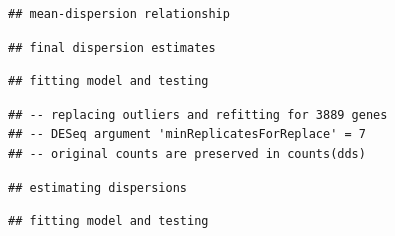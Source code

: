 \documentclass[]{article}
\begin{document}
\begin{verbatim}
## mean-dispersion relationship
\end{verbatim}

\begin{verbatim}
## final dispersion estimates
\end{verbatim}

\begin{verbatim}
## fitting model and testing
\end{verbatim}

\begin{verbatim}
## -- replacing outliers and refitting for 3889 genes
## -- DESeq argument 'minReplicatesForReplace' = 7 
## -- original counts are preserved in counts(dds)
\end{verbatim}

\begin{verbatim}
## estimating dispersions
\end{verbatim}

\begin{verbatim}
## fitting model and testing
\end{verbatim}
\end{document}
